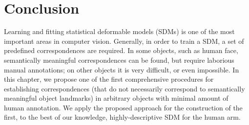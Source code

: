 \section{Conclusion}
Learning and fitting statistical deformable models (SDMs) is one of the most important areas in computer vision. Generally, in order to train a SDM, a set of predefined correspondences are required. In some objects, such as human face, semantically meaningful correspondences can be found, but require laborious manual annotations; on other objects it is very difficult, or even impossible. In this chapter, we propose one of the first comprehensive procedures for establishing correspondences (that do not necessarily correspond to semantically meaningful object landmarks) in arbitrary objects with minimal amount of human annotation. We apply the proposed approach for the construction of the first, to the best of our knowledge, highly-descriptive SDM for the human arm. 